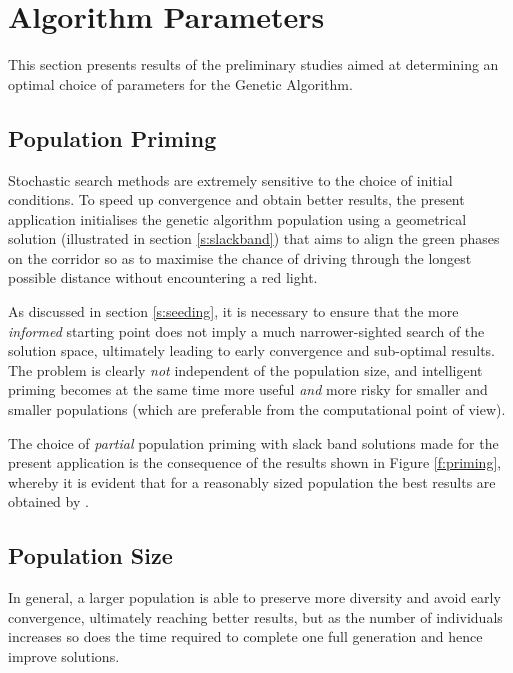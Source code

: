 \section{Algorithm Parameters}
This section presents results of the preliminary studies aimed at determining an optimal choice of parameters for the Genetic Algorithm.

\subsection{Population Priming} \label{s:poppriming}
Stochastic search methods are extremely sensitive to the choice of initial conditions. To speed up convergence and obtain better results, the present application initialises the genetic algorithm population using a geometrical solution (illustrated in section \ref{s:slackband}) that aims to align the green phases on the corridor so as to maximise the chance of driving through the longest possible distance without encountering a red light.

As discussed in section \ref{s:seeding}, it is necessary to ensure that the more \emph{informed} starting point does not imply a much narrower-sighted search of the solution space, ultimately leading to early convergence and sub-optimal results. The problem is clearly \emph{not} independent of the population size, and intelligent priming becomes at the same time more useful \emph{and} more risky for smaller and smaller populations (which are preferable from the computational point of view).

The choice of \emph{partial} population priming with slack band solutions made for the present application is the consequence of the results shown in Figure \ref{f:priming}, whereby it is evident that for a reasonably sized population  the best results are obtained by .



\subsection{Population Size} \label{r:popsize}
In general, a larger population is able to preserve more diversity and avoid early convergence, ultimately reaching better results, but as the number of individuals increases so does the time required to complete one full generation and hence  improve solutions.

